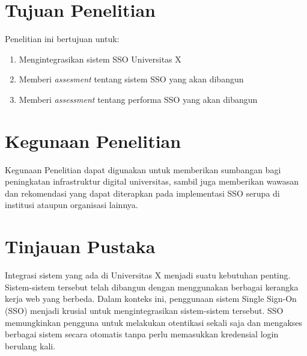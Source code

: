 \documentclass{article}
\begin{document}
\section{Tujuan Penelitian}
Penelitian ini bertujuan untuk:
\begin{enumerate}
    \item Mengintegrasikan sistem SSO Universitas X
    \item Memberi \emph{assesment} tentang sistem SSO yang akan dibangun
    \item Memberi \emph{assessment} tentang performa SSO yang akan dibangun
\end{enumerate}
\section{Kegunaan Penelitian}
Kegunaan Penelitian dapat digunakan untuk  memberikan sumbangan bagi peningkatan infrastruktur digital universitas, sambil juga memberikan wawasan dan rekomendasi yang dapat diterapkan pada implementasi SSO serupa di institusi ataupun organisasi lainnya.

\section{Tinjauan Pustaka}
Integrasi sistem yang ada di Universitas X menjadi suatu kebutuhan penting. Sistem-sistem tersebut telah dibangun dengan menggunakan berbagai kerangka kerja web yang berbeda. Dalam konteks ini, penggunaan sistem Single Sign-On (SSO) menjadi krusial untuk mengintegrasikan sistem-sistem tersebut. SSO memungkinkan pengguna untuk melakukan otentikasi sekali saja dan mengakses berbagai sistem secara otomatis tanpa perlu memasukkan kredensial login berulang kali\autocite{ComparativeAnaWaluyo2022}.
\end{document}
